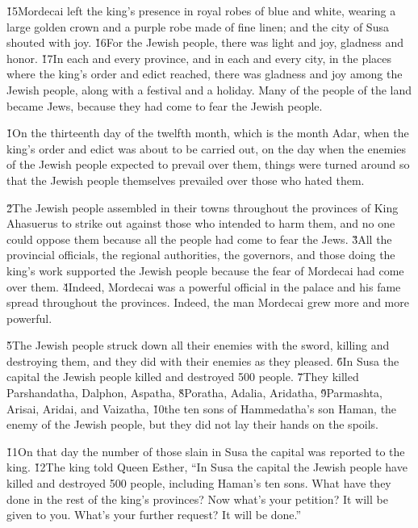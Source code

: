 \v{15}Mordecai left the king's presence in royal robes of blue and white, wearing a large golden crown and a purple robe made of fine linen; and the city of Susa shouted with joy. \v{16}For the Jewish people, there was light and joy, gladness and honor. \v{17}In each and every province, and in each and every city, in the places where the king's order and edict reached, there was gladness and joy among the Jewish people, along with a festival and a holiday. Many of the people of the land became Jews, because they had come to fear the Jewish people.

\v{1}On the thirteenth day of the twelfth month, which is the month Adar, when the king's order and edict was about to be carried out, on the day when the enemies of the Jewish people expected to prevail over them, things were turned around so that the Jewish people themselves prevailed over those who hated them.

\v{2}The Jewish people assembled in their towns throughout the provinces of King Ahasuerus to strike out against those who intended to harm them, and no one could oppose them because all the people had come to fear the Jews. \v{3}All the provincial officials, the regional authorities, the governors, and those doing the king's work supported the Jewish people because the fear of Mordecai had come over them. \v{4}Indeed, Mordecai was a powerful official in the palace and his fame spread throughout the provinces. Indeed, the man Mordecai grew more and more powerful.

\v{5}The Jewish people struck down all their enemies with the sword, killing and destroying them, and they did with their enemies as they pleased. \v{6}In Susa the capital the Jewish people killed and destroyed 500 people. \v{7}They killed Parshandatha, Dalphon, Aspatha, \v{8}Poratha, Adalia, Aridatha, \v{9}Parmashta, Arisai, Aridai, and Vaizatha, \v{10}the ten sons of Hammedatha's son Haman, the enemy of the Jewish people, but they did not lay their hands on the spoils.

\v{11}On that day the number of those slain in Susa the capital was reported to the king. \v{12}The king told Queen Esther, ``In Susa the capital the Jewish people have killed and destroyed 500 people, including Haman's ten sons. What have they done in the rest of the king's provinces? Now what's your petition? It will be given to you. What's your further request? It will be done.''

